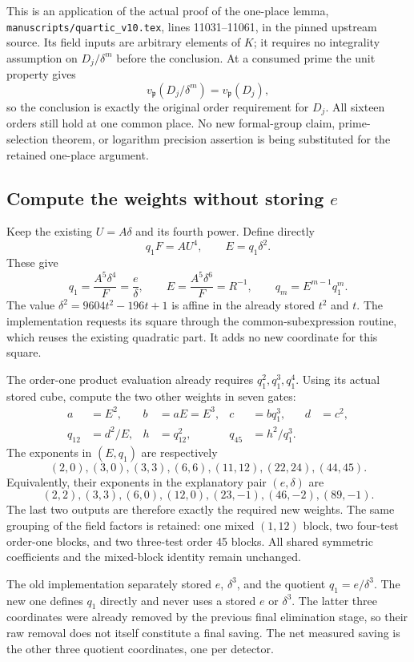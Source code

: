 This is an application of the actual proof of the one-place lemma,
\texttt{manuscripts/quartic\_v10.tex}, lines 11031--11061, in the pinned
upstream source. Its field inputs are arbitrary elements of $K$; it
requires no integrality assumption on $D_j/\delta^m$ before the
conclusion. At a consumed prime the unit property gives
\[
 v_{\mathfrak p}(D_j/\delta^m)=v_{\mathfrak p}(D_j),
\]
so the conclusion is exactly the original order requirement for $D_j$.
All sixteen orders still hold at one common place. No new formal-group
claim, prime-selection theorem, or logarithm precision assertion is
being substituted for the retained one-place argument.

\subsection{Compute the weights without storing $e$}

Keep the existing $U=A\delta$ and its fourth power. Define directly
\[
 q_1F=A U^4,\qquad E=q_1\delta^2.
\]
These give
\[
 q_1=\frac{A^5\delta^4}{F}=\frac e\delta,
 \qquad E=\frac{A^5\delta^6}{F}=R^{-1},
 \qquad q_m=E^{m-1}q_1^m.
\]
The value $\delta^2=9604t^2-196t+1$ is affine in the already stored
$t^2$ and $t$. The implementation requests its square through the
common-subexpression routine, which reuses the existing quadratic
part. It adds no new coordinate for this square.

The order-one product evaluation already requires $q_1^2,q_1^3,q_1^4$.
Using its actual stored cube, compute the two other weights in seven gates:
\begin{align*}
 a&=E^2,& b&=aE=E^3,& c&=bq_1^3,& d&=c^2,\\
 q_{12}&=d^2/E,& h&=q_{12}^2,&q_{45}&=h^2/q_1^3.
\end{align*}
The exponents in $(E,q_1)$ are respectively
\[
 (2,0),(3,0),(3,3),(6,6),(11,12),(22,24),(44,45).
\]
Equivalently, their exponents in the explanatory pair $(e,\delta)$ are
\[
 (2,2),(3,3),(6,0),(12,0),(23,-1),(46,-2),(89,-1).
\]
The last two outputs are therefore exactly the required new weights.
The same grouping of the field factors is retained: one mixed $(1,12)$
block, two four-test order-one blocks, and two three-test order 45 blocks.
All shared symmetric coefficients and the mixed-block identity remain
unchanged.

The old implementation separately stored $e$, $\delta^3$, and the
quotient $q_1=e/\delta^3$. The new one defines $q_1$ directly and never
uses a stored $e$ or $\delta^3$. The latter three coordinates were
already removed by the previous final elimination stage, so their raw
removal does not itself constitute a final saving. The net measured
saving is the other three quotient coordinates, one per detector.

